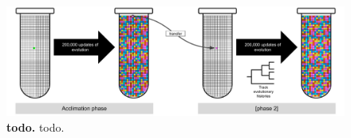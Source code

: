 \begin{figure}[h!]
    \centering
    \includegraphics[width=\textwidth]{media/experiment-overview-draft.pdf}
    \caption{\small
    \textbf{todo.}
    todo.
    }
    \label{fig:experimental-design-overview}
\end{figure}